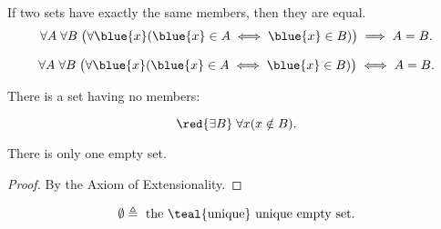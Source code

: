
\begin{frame}{}
  \begin{axiom}
    If two sets have exactly the same members, then they are equal.
    \[
      \forall A\; \forall B\; \big(\forall  \blue{x} (\blue{x} \in A \iff \blue{x} \in B) \big) \implies A = B.
    \]
  \end{axiom}

  \pause
  \[
    \forall A\; \forall B\; \big(\forall  \blue{x} (\blue{x} \in A \iff \blue{x} \in B) \big) \iff A = B.
  \]
\end{frame}

\begin{frame}{}
  \begin{axiom}
    There is a set having no members:

    \[
      \red{\exists B}\; \forall x (x \notin B).
    \]
  \end{axiom}

  \pause
  \begin{theorem}
    There is only one empty set.
  \end{theorem}

  \pause
  \begin{proof}
    By the Axiom of Extensionality.
  \end{proof}

  \pause
  \begin{definition}[``$\emptyset$'']
    \[
      \emptyset \triangleq \text{ the \teal{unique} unique empty set}.
    \]
  \end{definition}
\end{frame}
